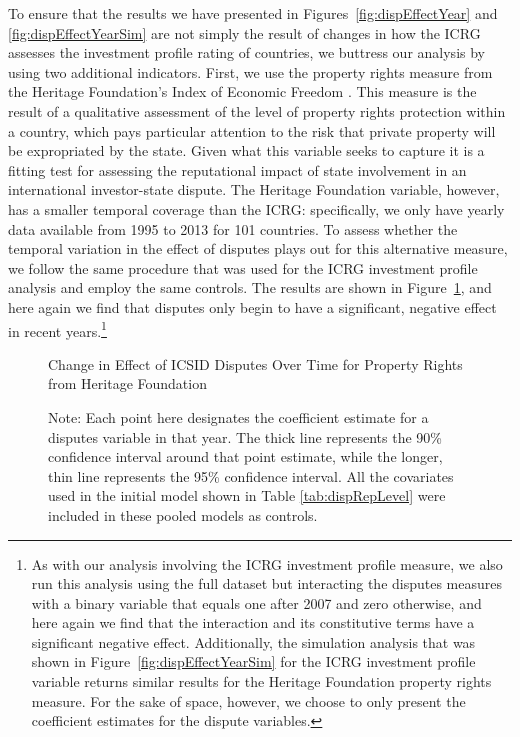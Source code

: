 \documentclass[12pt,onesided]{amsart}
\begin{document}
To ensure that the results we have presented in Figures~\ref{fig:dispEffectYear} and \ref{fig:dispEffectYearSim} are not simply the result of changes in how the ICRG assesses the investment profile rating of countries, we buttress our analysis by using two additional indicators. First, we use the property rights measure from the Heritage Foundation's Index of Economic Freedom \citep{miles:etal:2004}. This measure is the result of a qualitative assessment of the level of property rights protection within a country, which pays particular attention to the risk that private property will be expropriated by the state. Given what this variable seeks to capture it is a fitting test for assessing the reputational impact of state involvement in an international investor-state dispute. The Heritage Foundation variable, however, has a smaller temporal coverage than the ICRG: specifically, we only have yearly data available from 1995 to 2013 for 101 countries. To assess whether the temporal variation in the effect of disputes plays out for this alternative measure, we follow the same procedure that was used for the ICRG investment profile analysis and employ the same controls. The results are shown in Figure~\ref{fig:dispEffectYear_herit}, and here again we find that disputes only begin to have a significant, negative effect in recent years.\footnote{As with our analysis involving the ICRG investment profile measure, we also run this analysis using the full dataset but interacting the disputes measures with a binary variable that equals one after 2007 and zero otherwise, and here again we find that the interaction and its constitutive terms have a significant negative effect. Additionally, the simulation analysis that was shown in Figure~\ref{fig:dispEffectYearSim} for the ICRG investment profile variable returns similar results for the Heritage Foundation property rights measure. For the sake of space, however, we choose to only present the coefficient estimates for the dispute variables.} 

\begin{figure}[ht]
	\centering
	\caption{Change in Effect of ICSID Disputes Over Time for Property Rights from Heritage Foundation}
	\label{fig:dispEffectYear_herit}
	\resizebox{1\textwidth}{!}{}
	\caption*{Note: Each point here designates the coefficient estimate for a disputes variable in that year. The thick line represents the 90\% confidence interval around that point estimate, while the longer, thin line represents the 95\% confidence interval. All the covariates used in the initial model shown in Table \ref{tab:dispRepLevel} were included in these pooled models as controls.}
\end{figure}
\FloatBarrier
\end{document}
